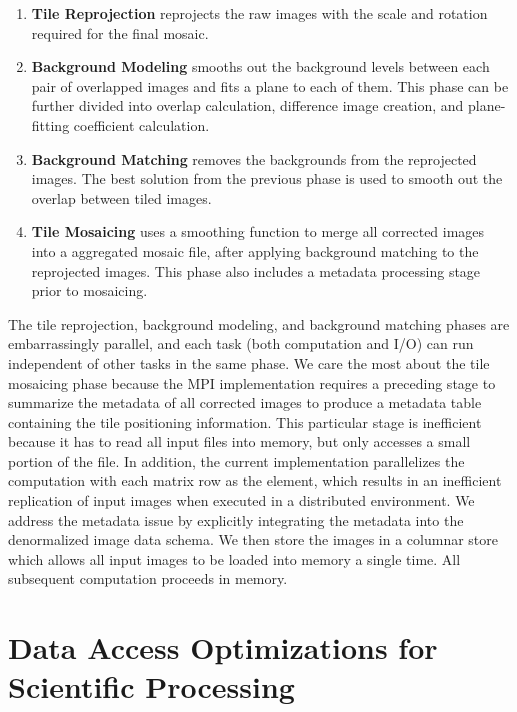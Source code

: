 \documentclass{sig-alternate}
\begin{document}
\begin{enumerate}
\item \textbf{Tile Reprojection} reprojects the raw images with the scale and rotation required for the
final mosaic. 
\item \textbf{Background Modeling} smooths out the background levels between each pair of
overlapped images and fits a plane to each of them. This phase can be further divided into overlap
calculation, difference image creation, and plane-fitting coefficient calculation.
\item \textbf{Background Matching} removes the backgrounds \linebreak from the reprojected images. The best solution
from the previous phase is used to smooth out the overlap between tiled images.
\item \textbf{Tile Mosaicing} uses a smoothing function to merge all corrected images into a aggregated mosaic file,
after applying background matching to the reprojected images. This phase also includes a metadata processing
stage prior to mosaicing.
\end{enumerate}

The tile reprojection, background modeling, and background matching phases are embarrassingly
parallel, and each task (both computation and I/O) can run independent of other tasks in the same
phase. We care the most about the tile mosaicing phase because the MPI implementation requires a preceding
stage to summarize the metadata of all corrected images to produce a metadata table containing the tile
positioning information. This particular stage is inefficient because it has to read all input files into memory, but
only accesses a small portion of the file. In addition, the current implementation parallelizes the computation with
each matrix row as the element, which results in an inefficient replication of input images when executed in a
distributed environment. We address the metadata issue by explicitly integrating the metadata into the
denormalized image data schema. We then store the images in a columnar store which allows all input images to
be loaded into memory a single time. All subsequent computation proceeds in memory.

\section{Data Access Optimizations for \\ Scientific Processing}
\label{sec:optimizations-scientific-processing}
\end{document}
